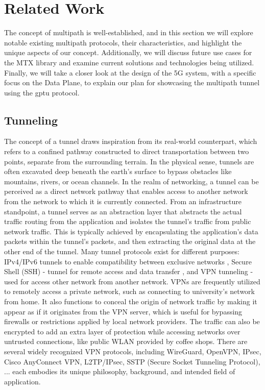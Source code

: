 \cleardoublepage\chapter{Related Work}\label{sec:related_work}\minitoc\vspace{.5cm}

The concept of multipath is well-established, and in this section we will explore notable existing multipath protocols, their characteristics, and highlight the unique aspects of our concept. 
Additionally, we will discuss future use cases for the \ac{MTX} library and examine current solutions and technologies being utilized. 
Finally, we will take a closer look at the design of the 5G system, with a specific focus on the Data Plane, to explain our plan for showcasing the multipath tunnel using the \ac{gptu} protocol.

\section{Tunneling}
The concept of a tunnel draws inspiration from its real-world counterpart, which refers to a confined pathway constructed to direct transportation between two points, separate from the surrounding terrain. 
In the physical sense, tunnels are often excavated deep beneath the earth's surface to bypass obstacles like mountains, rivers, or ocean channels.
In the realm of networking, a tunnel can be perceived as a direct network pathway that enables access to another network from the network to which it is currently connected. 
From an infrastructure standpoint, a tunnel serves as an abstraction layer that abstracts the actual traffic routing from the application and isolates the tunnel's traffic from public network traffic. 
This is typically achieved by encapsulating the application's data packets within the tunnel's packets, and then extracting the original data at the other end of the tunnel.
Many tunnel protocols exist for different purposes: IPv4/IPv6 tunnels to enable compatibility between exclusive networks \cite{rfc4380_Teredo_ipv6_tunnel_udp}, Secure Shell (SSH) - tunnel for remote access and data transfer \cite{rfc4251_ssh_protocol}, and \ac{VPN} tunneling - used for access other network from another network. 
\ac{VPN}s are frequently utilized to remotely access a private network, such as connecting to university's network from home. 
It also functions to conceal the origin of network traffic by making it appear as if it originates from the VPN server, which is useful for bypassing firewalls or restrictions applied by local network providers.
The traffic can also be encrypted to add an extra layer of protection while accessing networks over untrusted connections, like public WLAN provided by coffee shops.
There are several widely recognized VPN protocols, including WireGuard, OpenVPN, IPsec, Cisco AnyConnect VPN, L2TP/IPsec, SSTP (Secure Socket Tunneling Protocol), ... each embodies its unique philosophy, background, and intended field of application.



